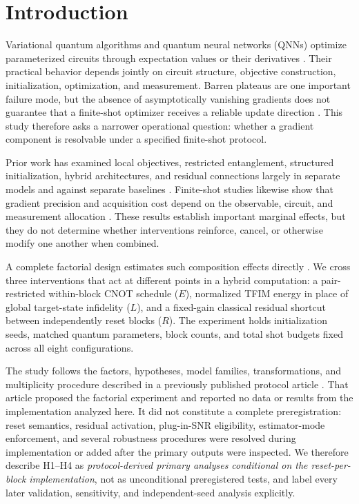 \documentclass[pdflatex,sn-basic,Numbered]{sn-jnl}
\begin{document}
\section{Introduction}\label{sec:introduction}

Variational quantum algorithms and quantum neural networks (QNNs) optimize parameterized circuits through expectation values or their derivatives \cite{cerezo2021vqa,mitarai2018quantum,schuld2019evaluating}. Their practical behavior depends jointly on circuit structure, objective construction, initialization, optimization, and measurement. Barren plateaus are one important failure mode, but the absence of asymptotically vanishing gradients does not guarantee that a finite-shot optimizer receives a reliable update direction \cite{mcclean2018barren,anschuetz2022traps,thanasilp2023subtleties,larocca2025barren}. This study therefore asks a narrower operational question: whether a gradient component is resolvable under a specified finite-shot protocol.

Prior work has examined local objectives, restricted entanglement, structured initialization, hybrid architectures, and residual connections largely in separate models and against separate baselines \cite{cerezo2021costfunction,ortizmarrero2021entanglement,patti2021entanglement,grant2019identity,skolik2021layerwise,beer2020training,kashif2024resqnets}. Finite-shot studies likewise show that gradient precision and acquisition cost depend on the observable, circuit, and measurement allocation \cite{kubler2020adaptive,tamiya2022stochastic,kreplin2024finite,chinzei2025tradeoff,bowles2025backpropagation}. These results establish important marginal effects, but they do not determine whether interventions reinforce, cancel, or otherwise modify one another when combined.

A complete factorial design estimates such composition effects directly \cite{montgomery2019design}. We cross three interventions that act at different points in a hybrid computation: a pair-restricted within-block CNOT schedule ($E$), normalized TFIM energy in place of global target-state infidelity ($L$), and a fixed-gain classical residual shortcut between independently reset blocks ($R$). The experiment holds initialization seeds, matched quantum parameters, block counts, and total shot budgets fixed across all eight configurations.

The study follows the factors, hypotheses, model families, transformations, and multiplicity procedure described in a previously published protocol article \cite{shen2026gradient}. That article proposed the factorial experiment and reported no data or results from the implementation analyzed here. It did not constitute a complete preregistration: reset semantics, residual activation, plug-in-SNR eligibility, estimator-mode enforcement, and several robustness procedures were resolved during implementation or added after the primary outputs were inspected. We therefore describe H1--H4 as \emph{protocol-derived primary analyses conditional on the reset-per-block implementation}, not as unconditional preregistered tests, and label every later validation, sensitivity, and independent-seed analysis explicitly.
\end{document}
